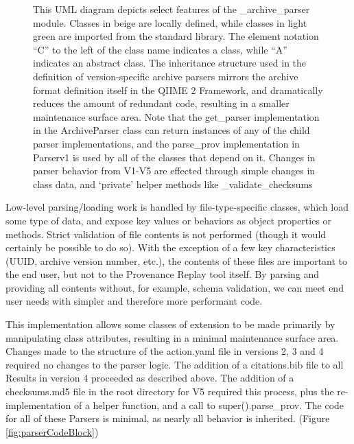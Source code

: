 \begin{figure}[htp]
\begin{minipage}[c]{0.5\textwidth}
    \end{minipage}\hfill
    \begin{minipage}[c]{0.45\textwidth}
\caption[UML Class diagram of the Version-specific Archive Parsers]%
{This UML diagram depicts select features of the \_archive\_parser module. Classes
in beige are locally defined, while classes in light green are imported from the
standard library. The element notation “C” to the left of the class name
indicates a class, while “A” indicates an abstract class. The inheritance
structure used in the definition of version-specific archive parsers mirrors the
archive format definition itself in the QIIME 2 Framework, and dramatically
reduces the amount of redundant code, resulting in a smaller maintenance surface
area. Note that the get\_parser implementation in the ArchiveParser class can
return instances of any of the child parser implementations, and the parse\_prov
implementation in Parserv1 is used by all of the classes that depend on it.
Changes in parser behavior from V1-V5 are effected through simple changes in
class data, and ‘private’ helper methods like \_validate\_checksums}
    \end{minipage}
    \label{fig:archiveParsersUML}
\end{figure}

Low-level parsing/loading work is handled by file-type-specific classes, which
load some type of data, and expose key values or behaviors as object properties
or methods. Strict validation of file contents is not performed (though it would
certainly be possible to do so). With the exception of a few key characteristics
(UUID, archive version number, etc.), the contents of these files are important
to the end user, but not to the Provenance Replay tool itself. By parsing and
providing all contents without, for example, schema validation, we can meet end
user needs with simpler and therefore more performant code.

This implementation allows some classes of extension to be made primarily by
manipulating class attributes, resulting in a minimal maintenance surface area.
Changes made to the structure of the action.yaml file in versions 2, 3 and 4
required no changes to the parser logic. The addition of a citations.bib file to
all Results in version 4 proceeded as described above. The addition of a
checksums.md5 file in the root directory for V5 required this process, plus the
re-implementation of a helper function, and a call to super().parse\_prov. The
code for all of these Parsers is minimal, as nearly all behavior is inherited. 
(Figure \ref{fig:parserCodeBlock})

